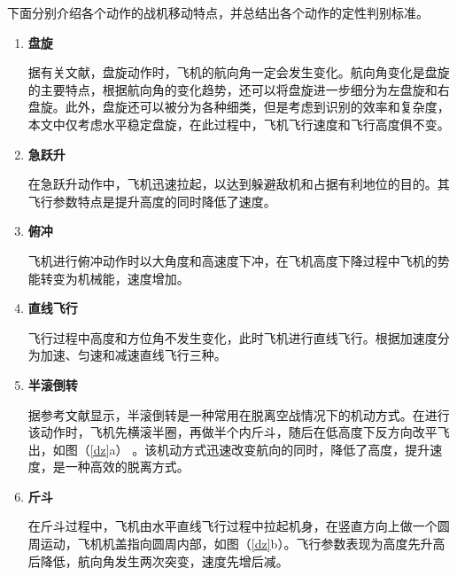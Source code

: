 \documentclass{my_paper}
\begin{document}
下面分别介绍各个动作的战机移动特点，并总结出各个动作的定性判别标准。
\begin{enumerate}
    \item \textbf{盘旋}
    
    据有关文献\cite{4}，盘旋动作时，飞机的航向角一定会发生变化。航向角变化是盘旋的主要特点，根据航向角的变化趋势，还可以将盘旋进一步细分为左盘旋和右盘旋。此外，盘旋还可以被分为各种细类，但是考虑到识别的效率和复杂度，本文中仅考虑水平稳定盘旋，在此过程中，飞机飞行速度和飞行高度俱不变。

    \item \textbf{急跃升}
    
    在急跃升动作中，飞机迅速拉起，以达到躲避敌机和占据有利地位的目的。其飞行参数特点是提升高度的同时降低了速度。
    \item \textbf{俯冲}
    
    飞机进行俯冲动作时以大角度和高速度下冲，在飞机高度下降过程中飞机的势能转变为机械能，速度增加。
    \item \textbf{直线飞行}
    
    飞行过程中高度和方位角不发生变化，此时飞机进行直线飞行。根据加速度分为加速、匀速和减速直线飞行三种。

    \item \textbf{半滚倒转}
    
    据参考文献显示\cite{5}，半滚倒转是一种常用在脱离空战情况下的机动方式。在进行该动作时，飞机先横滚半圈，再做半个内斤斗，随后在低高度下反方向改平飞出，如图（\ref{dz}a） 。该机动方式迅速改变航向的同时，降低了高度，提升速度，是一种高效的脱离方式。

    \item \textbf{斤斗}
    
    在斤斗过程中，飞机由水平直线飞行过程中拉起机身，在竖直方向上做一个圆周运动，飞机机盖指向圆周内部，如图（\ref{dz}b）。飞行参数表现为高度先升高后降低，航向角发生两次突变，速度先增后减。


\end{enumerate}
\end{document}
